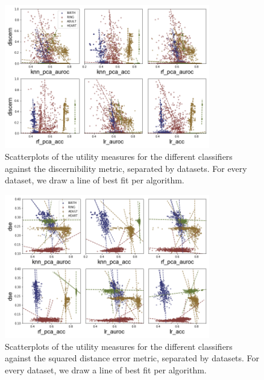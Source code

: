 \begin{figure}[!ht]
    \centering
    \includegraphics[width=0.8\textwidth]{project/fig/scatter_sep_trends/discern_scatter.png}
    \caption{Scatterplots of the utility measures for the different classifiers against the discernibility metric, separated by datasets. For every dataset, we draw a line of best fit per algorithm.}
\end{figure}

\begin{figure}[!ht]
    \centering
    \includegraphics[width=0.8\textwidth]{project/fig/scatter_sep_trends/dse_scatter.png}
    \caption{Scatterplots of the utility measures for the different classifiers against the squared distance error metric, separated by datasets. For every dataset, we draw a line of best fit per algorithm.}
\end{figure}

